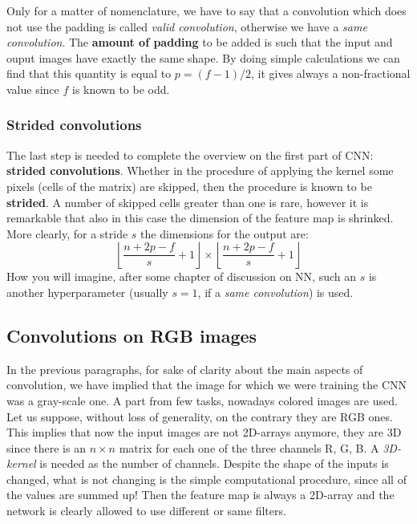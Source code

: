 Only for a matter of nomenclature, we have to say that a convolution which does not use the padding is called \textit{valid convolution}, otherwise we have a \textit{same convolution}. The \textbf{amount of padding} to be added is such that the input and ouput images have exactly the same shape. By doing simple calculations we can find that this quantity is equal to $p=(f-1)/2$, it gives always a non-fractional value since $f$ is known to be odd.

\subsubsection{Strided convolutions}
The last step is needed to complete the overview on the first part of CNN: \textbf{strided convolutions}. Whether in the procedure of applying the kernel some pixels (cells of the matrix) are skipped, then the procedure is known to be \textbf{strided}. A number of skipped cells greater than one is rare, however it is remarkable that also in this case the dimension of the feature map is shrinked. More clearly, for a stride $s$ the dimensions for the output are: 
\begin{equation*}
    \left\lfloor \frac{n+2p-f}{s}+1\right\rfloor\times
    \left\lfloor \frac{n+2p-f}{s}+1\right\rfloor
\end{equation*}
How you will imagine, after some chapter of discussion on NN, such an $s$ is another hyperparameter (usually $s=1$, if a \textit{same convolution}) is used.



\subsection{Convolutions on RGB images}
In the previous paragraphs, for sake of clarity about the main aspects of convolution, we have implied that the image for which we were training the CNN was a gray-scale one. A part from few tasks, nowadays colored images are used.
Let us suppose, without loss of generality, on the contrary they are RGB ones. This implies that now the input images are not 2D-arrays anymore, they are 3D since there is an $n\times{n}$ matrix for each one of the three channels R, G, B. A \textit{3D-kernel} is needed as the number of channels. Despite the shape of the inputs is changed, what is not changing is the simple computational procedure, since all of the values are summed up! Then the feature map is always a 2D-array and the network is clearly allowed to use different or same filters. 

